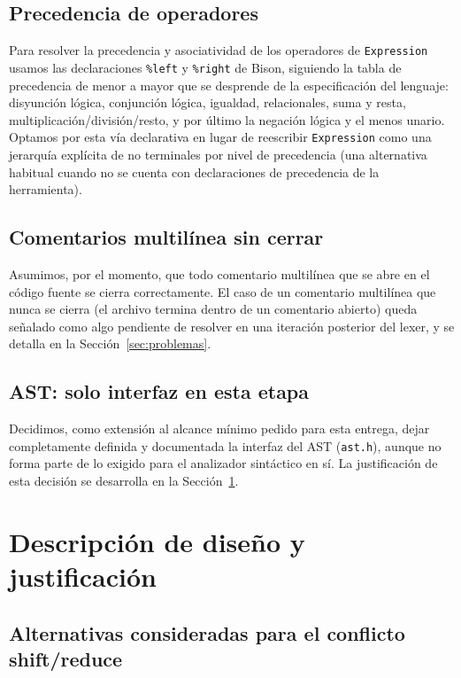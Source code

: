 \documentclass[11pt,a4paper]{article}
\begin{document}
\subsection{Precedencia de operadores}

Para resolver la precedencia y asociatividad de los operadores de
\texttt{Expression} usamos las declaraciones \texttt{\%left} y
\texttt{\%right} de Bison, siguiendo la tabla de precedencia de menor a mayor
que se desprende de la especificación del lenguaje: disyunción lógica,
conjunción lógica, igualdad, relacionales, suma y resta,
multiplicación/división/resto, y por último la negación lógica y el menos
unario. Optamos por esta vía declarativa en lugar de reescribir
\texttt{Expression} como una jerarquía explícita de no terminales por nivel
de precedencia (una alternativa habitual cuando no se cuenta con
declaraciones de precedencia de la herramienta).

\subsection{Comentarios multilínea sin cerrar}

Asumimos, por el momento, que todo comentario multilínea que se abre en el
código fuente se cierra correctamente. El caso de un comentario multilínea
que nunca se cierra (el archivo termina dentro de un comentario abierto)
queda señalado como algo pendiente de resolver en una iteración posterior del
lexer, y se detalla en la Sección~\ref{sec:problemas}.

\subsection{AST: solo interfaz en esta etapa}

Decidimos, como extensión al alcance mínimo pedido para esta entrega, dejar
completamente definida y documentada la interfaz del AST (\texttt{ast.h}),
aunque no forma parte de lo exigido para el analizador sintáctico en sí. La
justificación de esta decisión se desarrolla en la Sección~\ref{sec:ast}.

\section{Descripción de diseño y justificación}
\label{sec:ast}

\subsection{Alternativas consideradas para el conflicto shift/reduce}
\end{document}

